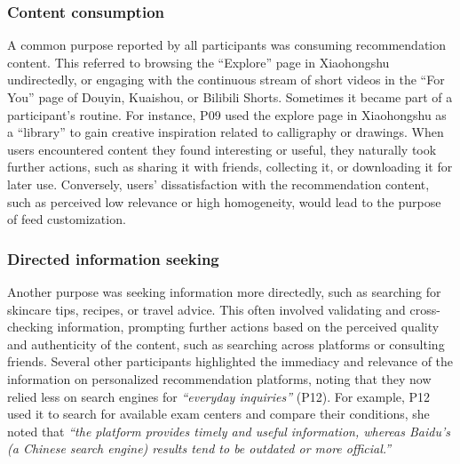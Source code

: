 \subsubsection{Content consumption} 
A common purpose reported by all participants was consuming recommendation content. This referred to browsing the ``Explore'' page in Xiaohongshu undirectedly, or engaging with the continuous stream of short videos in the ``For You'' page of Douyin, Kuaishou, or Bilibili Shorts. Sometimes it became part of a participant’s routine. For instance, P09 used the explore page in Xiaohongshu as a ``library'' to gain creative inspiration related to calligraphy or drawings. When users encountered content they found interesting or useful, they naturally took further actions, such as sharing it with friends, collecting it, or downloading it for later use. Conversely, users' dissatisfaction with the recommendation content, such as perceived low relevance or high homogeneity, would lead to the purpose of feed customization.

\subsubsection{Directed information seeking} 
Another purpose was seeking information more directedly, such as searching for skincare tips, recipes, or travel advice. This often involved validating and cross-checking information, prompting further actions based on the perceived quality and authenticity of the content, such as searching across platforms or consulting friends. Several other participants highlighted the immediacy and relevance of the information on personalized recommendation platforms, noting that they now relied less on search engines for \textit{``everyday inquiries''} (P12). For example, P12 used it to search for available exam centers and compare their conditions, she noted that \textit{``the platform provides timely and useful information, whereas Baidu's (a Chinese search engine) results tend to be outdated or more official.''}


